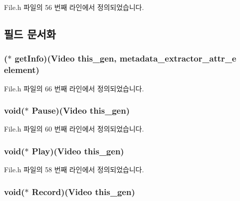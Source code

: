 File.\-h 파일의 56 번째 라인에서 정의되었습니다.



\subsection{필드 문서화}
\hypertarget{struct___video_a28466d9896b523beacac4a1add633aa6}{
\subsubsection[{get\-Info}]{($\ast$  get\-Info)({\bf Video} this\-\_\-gen, metadata\-\_\-extractor\-\_\-attr\-\_\-e element)}}\label{struct___video_a28466d9896b523beacac4a1add633aa6}


File.\-h 파일의 66 번째 라인에서 정의되었습니다.

\hypertarget{struct___video_af1d96a39825d2bb1300661601fd0aa7a}{
\subsubsection[{Pause}]{\setlength{\rightskip}{0pt plus 5cm}void($\ast$  Pause)({\bf Video} this\-\_\-gen)}}\label{struct___video_af1d96a39825d2bb1300661601fd0aa7a}


File.\-h 파일의 60 번째 라인에서 정의되었습니다.

\hypertarget{struct___video_a638d742602c39ab64bbded0f4521d106}{
\subsubsection[{Play}]{\setlength{\rightskip}{0pt plus 5cm}void($\ast$  Play)({\bf Video} this\-\_\-gen)}}\label{struct___video_a638d742602c39ab64bbded0f4521d106}


File.\-h 파일의 58 번째 라인에서 정의되었습니다.

\hypertarget{struct___video_aabb39795a3af7a469d10950d2b088ce6}{
\subsubsection[{Record}]{\setlength{\rightskip}{0pt plus 5cm}void($\ast$  Record)({\bf Video} this\-\_\-gen)}}\label{struct___video_aabb39795a3af7a469d10950d2b088ce6}


